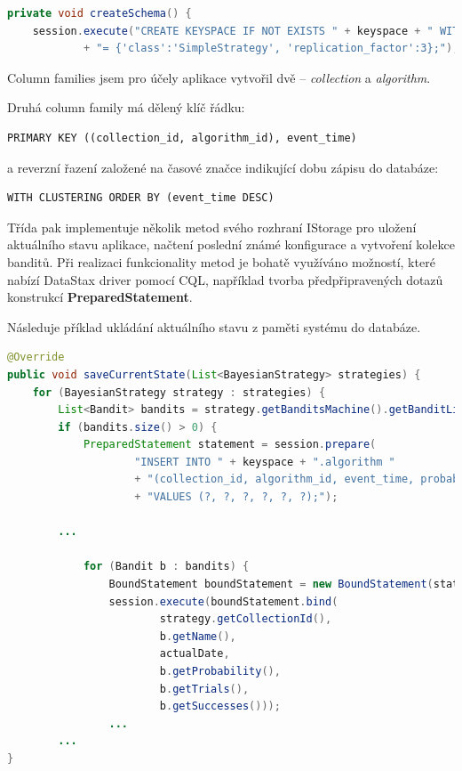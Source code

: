 \documentclass[thesis=M,czech]{FITthesis}[2014/05/07]
\begin{document}
\begin{lstlisting}[language=java]
private void createSchema() {        
    session.execute("CREATE KEYSPACE IF NOT EXISTS " + keyspace + " WITH replication "
            + "= {'class':'SimpleStrategy', 'replication_factor':3};");
\end{lstlisting}

Column families jsem pro účely aplikace vytvořil dvě – \emph{collection} a \emph{algorithm}.

Druhá column family má dělený klíč řádku:

\begin{verbatim}
PRIMARY KEY ((collection_id, algorithm_id), event_time)
\end{verbatim}

a reverzní řazení založené na časové značce indikující dobu zápisu do databáze:

\begin{verbatim}
WITH CLUSTERING ORDER BY (event_time DESC)
\end{verbatim}

Třída pak implementuje několik metod svého rozhraní IStorage pro uložení aktuálního stavu aplikace, načtení poslední známé konfigurace a vytvoření kolekce banditů. Při realizaci funkcionality metod je bohatě využíváno možností, které nabízí DataStax driver pomocí CQL, například tvorba předpřipravených dotazů konstrukcí \textbf{PreparedStatement}. 

Následuje příklad ukládání aktuálního stavu z paměti systému do databáze.

\begin{lstlisting}[language=java]
@Override
public void saveCurrentState(List<BayesianStrategy> strategies) {
    for (BayesianStrategy strategy : strategies) {
        List<Bandit> bandits = strategy.getBanditsMachine().getBanditList();
        if (bandits.size() > 0) {
            PreparedStatement statement = session.prepare(
                    "INSERT INTO " + keyspace + ".algorithm "
                    + "(collection_id, algorithm_id, event_time, probability_in_time, trials_rate, successes_rate) "
                    + "VALUES (?, ?, ?, ?, ?, ?);");

        ...

            for (Bandit b : bandits) {
                BoundStatement boundStatement = new BoundStatement(statement);
                session.execute(boundStatement.bind(
                        strategy.getCollectionId(),
                        b.getName(),
                        actualDate,
                        b.getProbability(),
                        b.getTrials(),
                        b.getSuccesses()));
                ...
        ...
}
\end{lstlisting}
\end{document}
